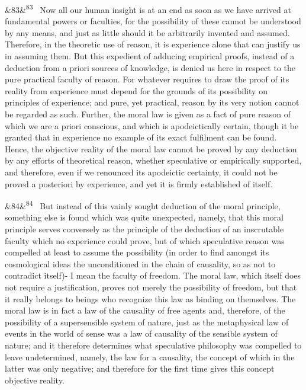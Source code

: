 \documentclass[12pt]{article}
\newcommand{\para}[1][]{\par\noindent\ifx&#1&\else\textsuperscript{\footnotesize #1}~\fi}
\begin{document}
\para[83] Now all our human insight is at an end as soon as we have arrived at fundamental powers or faculties, for the possibility of these cannot be understood by any means, and just as little should it be arbitrarily invented and assumed. Therefore, in the theoretic use of reason, it is experience alone that can justify us in assuming them. But this expedient of adducing empirical proofs, instead of a deduction from a priori sources of knowledge, is denied us here in respect to the pure practical faculty of reason. For whatever requires to draw the proof of its reality from experience must depend for the grounds of its possibility on principles of experience; and pure, yet practical, reason by its very notion cannot be regarded as such. Further, the moral law is given as a fact of pure reason of which we are a priori conscious, and which is apodeictically certain, though it be granted that in experience no example of its exact fulfilment can be found. Hence, the objective reality of the moral law cannot be proved by any deduction by any efforts of theoretical reason, whether speculative or empirically supported, and therefore, even if we renounced its apodeictic certainty, it could not be proved a posteriori by experience, and yet it is firmly established of itself.

\para[84] But instead of this vainly sought deduction of the moral principle, something else is found which was quite unexpected, namely, that this moral principle serves conversely as the principle of the deduction of an inscrutable faculty which no experience could prove, but of which speculative reason was compelled at least to assume the possibility (in order to find amongst its cosmological ideas the unconditioned in the chain of causality, so as not to contradict itself)- I mean the faculty of freedom. The moral law, which itself does not require a justification, proves not merely the possibility of freedom, but that it really belongs to beings who recognize this law as binding on themselves. The moral law is in fact a law of the causality of free agents and, therefore, of the possibility of a supersensible system of nature, just as the metaphysical law of events in the world of sense was a law of causality of the sensible system of nature; and it therefore determines what speculative philosophy was compelled to leave undetermined, namely, the law for a causality, the concept of which in the latter was only negative; and therefore for the first time gives this concept objective reality.
\end{document}
